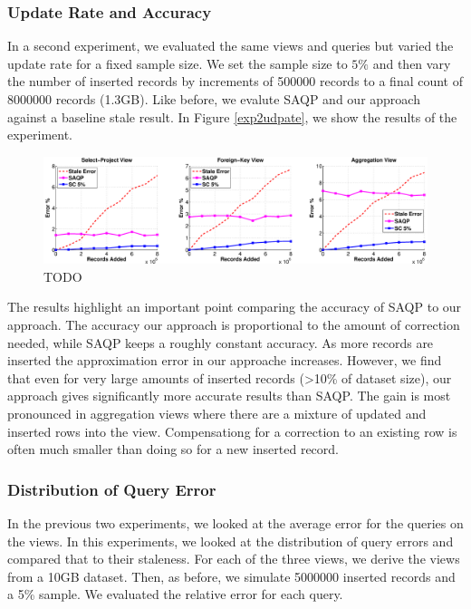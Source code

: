 \subsubsection{Update Rate and Accuracy}
In a second experiment, we evaluated the same views and queries but varied the update rate for a fixed sample size.
We set the sample size to $5\%$ and then vary the number of inserted records by increments of 500000 records to a final count of 8000000 records (1.3GB).
Like before, we evalute SAQP and our approach against a baseline stale result.
In Figure \ref{exp2udpate}, we show the results of the experiment. 

\begin{figure}[h]
\label{exp2update}
\centering
 \includegraphics[width=\textwidth]{exp/exp2-updatesize-accuracy.eps}
 \caption{TODO}
\end{figure}

The results highlight an important point comparing the accuracy of SAQP to our approach. 
The accuracy our approach is proportional to the amount of correction needed, while SAQP keeps a roughly constant accuracy.
As more records are inserted the approximation error in our approache increases.
However, we find that even for very large amounts of inserted records (>10\% of dataset size), our approach gives significantly more accurate results
than SAQP.
The gain is most pronounced in aggregation views where there are a mixture of updated and inserted rows into the view.
Compensationg for a correction to an existing row is often much smaller than doing so for a new inserted record.

\subsubsection{Distribution of Query Error}
In the previous two experiments, we looked at the average error for the queries on the views.
In this experiments, we looked at the distribution of query errors and compared that to their staleness.
For each of the three views, we derive the views from a 10GB dataset.
Then, as before, we simulate 5000000 inserted records and a 5\% sample.
We evaluated the relative error for each query.

